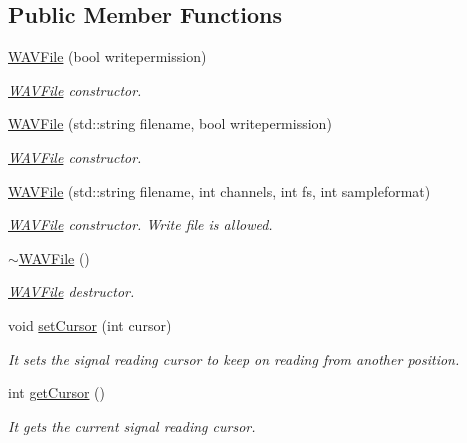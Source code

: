 \subsection*{Public Member Functions}
\begin{DoxyCompactItemize}
\item 
\hyperlink{class_w_a_v_file_a135707a98d9667622ce5056b68ed9abe}{W\+A\+V\+File} (bool writepermission)
\begin{DoxyCompactList}\small\item\em \hyperlink{class_w_a_v_file}{W\+A\+V\+File} constructor. \end{DoxyCompactList}\item 
\hyperlink{class_w_a_v_file_adc5bd36228dd18df58f2467546f367ef}{W\+A\+V\+File} (std\+::string filename, bool writepermission)
\begin{DoxyCompactList}\small\item\em \hyperlink{class_w_a_v_file}{W\+A\+V\+File} constructor. \end{DoxyCompactList}\item 
\hyperlink{class_w_a_v_file_a01baafcc33b738c26163b46bd05dde1d}{W\+A\+V\+File} (std\+::string filename, int channels, int fs, int sampleformat)
\begin{DoxyCompactList}\small\item\em \hyperlink{class_w_a_v_file}{W\+A\+V\+File} constructor. Write file is allowed. \end{DoxyCompactList}\item 
\mbox{\label{class_w_a_v_file_aae62931f83eaf70983372845dea3e205}} 
\hyperlink{class_w_a_v_file_aae62931f83eaf70983372845dea3e205}{$\sim$\+W\+A\+V\+File} ()
\begin{DoxyCompactList}\small\item\em \hyperlink{class_w_a_v_file}{W\+A\+V\+File} destructor. \end{DoxyCompactList}\item 
void \hyperlink{class_w_a_v_file_af9ffb0dd3ec2746708dd25546b2e7afd}{set\+Cursor} (int cursor)
\begin{DoxyCompactList}\small\item\em It sets the signal reading cursor to keep on reading from another position. \end{DoxyCompactList}\item 
int \hyperlink{class_w_a_v_file_a09b0c9107c31966537eaef404abbe0c6}{get\+Cursor} ()
\begin{DoxyCompactList}\small\item\em It gets the current signal reading cursor. \end{DoxyCompactList}\item 

\end{DoxyCompactItemize}

